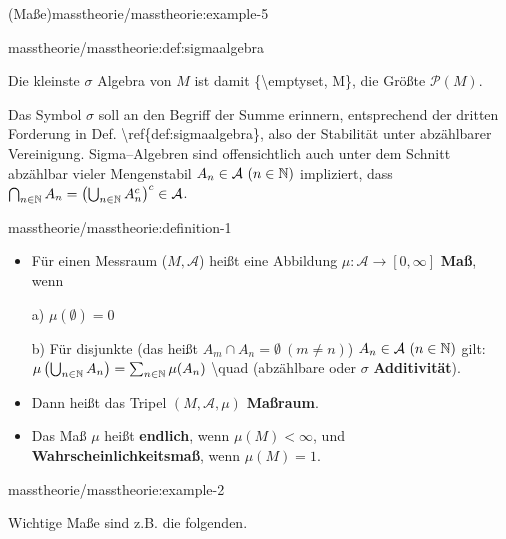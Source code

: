 \begin{example}{(Maße)}{masstheorie/masstheorie:example-5}
\begin{definition}{}{masstheorie/masstheorie:def:sigmaalgebra}
\begin{itemize}
\end{itemize}
\end{definition}

\par
Die kleinste \(\sigma\) Algebra von \(M\) ist damit \{\textbackslash{}emptyset, M\}, die Größte \(\mathcal{P}(M)\).

\par
Das Symbol \(\sigma\) soll an den Begriff der Summe erinnern, entsprechend der
dritten Forderung in Def. \textbackslash{}ref\{def:sigmaalgebra\}, also der Stabilität unter abzählbarer Vereinigung.
Sigma–Algebren sind offensichtlich auch unter dem Schnitt abzählbar vieler
Mengenstabil \(A_n\in \mathcal{A}\ (n\in\mathbb{N})\) impliziert, dass \(\bigcap_{n\in \mathbb{N}} A_n = \left(\bigcup_{n\in\mathbb{N}} A_n^c\right)^c\in \mathcal{A}\).
\begin{definition}{}{masstheorie/masstheorie:definition-1}


\begin{itemize}
\item {} 
\par
Für einen Messraum (\(M, \mathcal{A}\)) heißt eine Abbildung \(\mu: \mathcal{A}\to [0, \infty]\) \textbf{Maß}, wenn

\par
a) \(\mu(\emptyset) = 0\)

\par
b) Für disjunkte (das heißt \(A_m\cap A_n = \emptyset\ (m\neq n)\)) \(A_n\in \mathcal{A}\ (n\in\mathbb{N})\) gilt: \(\mu\left( \bigcup_{n\in\mathbb{N}}A_n \right) = \sum_{n\in\mathbb{N}}\mu (A_n)\) \textbackslash{}quad (abzählbare oder \(\sigma\) \textbf{Additivität}).

\item {} 
\par
Dann heißt das Tripel \((M, \mathcal{A}, \mu)\) \textbf{Maßraum}.

\item {} 
\par
Das Maß \(\mu\) heißt \textbf{endlich}, wenn \(\mu(M)<\infty\), und \textbf{Wahrscheinlichkeitsmaß}, wenn \(\mu(M)=1\).

\end{itemize}
\end{definition}
\begin{example}{}{masstheorie/masstheorie:example-2}



\par
Wichtige Maße sind z.B. die folgenden.
\begin{enumerate}


\end{enumerate}
\end{example}
\end{example}
